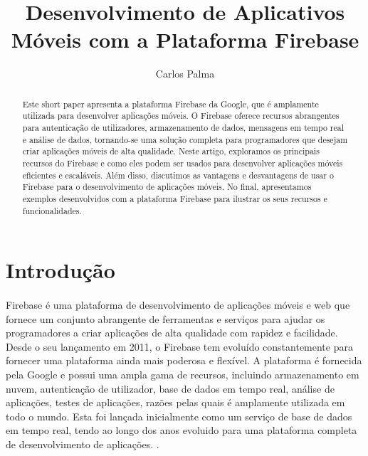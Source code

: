 \documentclass[runningheads]{llncs}
\begin{document}
%
\title{Desenvolvimento de Aplicativos Móveis com a Plataforma Firebase}
%
%
\author{Carlos Palma}

%
\maketitle              %
%
\begin{abstract}
 Este short paper apresenta a plataforma Firebase da Google, que é amplamente utilizada para desenvolver aplicações móveis. O Firebase oferece recursos abrangentes para autenticação de utilizadores, armazenamento de dados, mensagens em tempo real e análise de dados, tornando-se uma solução completa para programadores que desejam criar aplicações móveis de alta qualidade. Neste artigo, exploramos os principais recursos do Firebase e como eles podem ser usados para desenvolver aplicações móveis eficientes e escaláveis. Além disso, discutimos as vantagens e desvantagens de usar o Firebase para o desenvolvimento de aplicações móveis. No final, apresentamos exemplos desenvolvidos com a plataforma Firebase para ilustrar os seus recursos e funcionalidades.

\end{abstract}
%
%
%
\section{Introdução}
\paragraph{}
Firebase é uma plataforma de desenvolvimento de aplicações móveis e web que fornece um conjunto abrangente de ferramentas e serviços para ajudar os programadores a criar aplicações de alta qualidade com rapidez e facilidade. Desde o seu lançamento em 2011, o Firebase tem evoluído constantemente para fornecer uma plataforma ainda mais poderosa e flexível.
A plataforma é fornecida pela Google e possui uma ampla gama de recursos, incluindo armazenamento em nuvem, autenticação de utilizador, base de dados em tempo real, análise de aplicações, testes de aplicações, razões pelas quais é amplamente utilizada em todo o mundo.
Esta foi lançada inicialmente como um serviço de base de dados em tempo real, tendo ao longo dos anos evoluido para uma plataforma completa de desenvolvimento de aplicações. \cite{1}.
\end{document}
